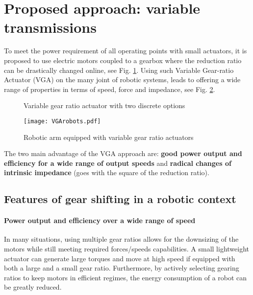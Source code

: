\section{Proposed approach: variable transmissions}
\label{sec:ProposedSolutionRobotsUsingMultipleGearRatioActuators}

To meet the power requirement of all operating points with small actuators, it is proposed to use electric motors coupled to a gearbox where the reduction ratio can be drastically changed online, see Fig. \ref{fig:2s}. Using such Variable Gear-ratio Actuator (VGA) on the many joint of robotic systems, leads to offering a wide range of properties in terms of speed, force and impedance, see Fig. \ref{fig:vgarobots}.

\begin{figure}[htb]
        \centering
        \caption{Variable gear ratio actuator with two discrete options}\label{fig:2s}
\end{figure}

\begin{figure}[htb]
        \centering
				\texttt{[image: VGArobots.pdf]}
        \caption{Robotic arm equipped with variable gear ratio actuators}\label{fig:vgarobots}
\end{figure}

The two main advantage of the VGA approach are: \textbf{good power output and efficiency for a wide range of output speeds} and \textbf{radical changes of intrinsic impedance} (goes with the square of the reduction ratio). 

\subsection{Features of gear shifting in a robotic context}

\paragraph{Power output and efficiency over a wide range of speed}
In many situations, using multiple gear ratios allows for the downsizing of the motors while still meeting required forces/speeds capabilities. A small lightweight actuator can generate large torques and move at high speed if equipped with both a large and a small gear ratio. Furthermore, by actively selecting gearing ratios to keep motors in efficient regimes, the energy consumption of a robot can be greatly reduced. 

